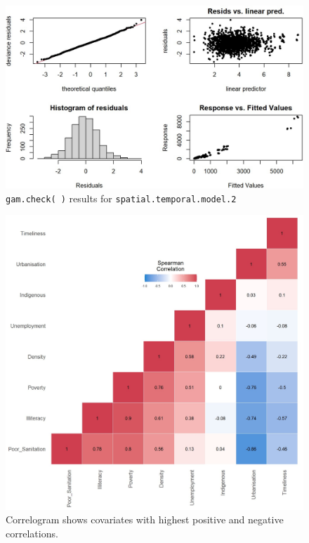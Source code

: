 \begin{figure}[H]
\centering
\includegraphics[scale=0.5]{spatio_temporal_model_2_check.jpg}
\caption{\label{fig:spatio_temporal_model_2_check}\texttt{gam.check( )} results for \texttt{spatial.temporal.model.2}}
\end{figure}

\begin{figure}[H]
\centering
\includegraphics[scale=0.4]{spearman_correl.jpg}
\caption{\label{fig:spearman_correl}Correlogram shows covariates with highest positive and negative correlations.}
\end{figure}


